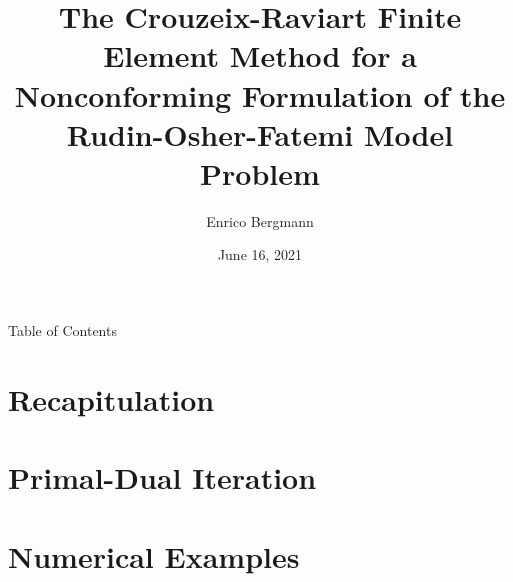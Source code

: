 \documentclass[xcolor=svgnames,english]{beamer}
\author{Enrico Bergmann}
\title{The Crouzeix-Raviart Finite Element Method for a Nonconforming
Formulation of the Rudin-Osher-Fatemi Model Problem}
\institute{Humboldt-Universität zu Berlin}
\date{June 16, 2021}
\begin{document}
\begin{frame}
	\maketitle
\end{frame}
  
\begin{frame}{Table of Contents}
  \tableofcontents
\end{frame}


\section{Recapitulation}


\section{Primal-Dual Iteration}


\section{Numerical Examples}

\end{document}
